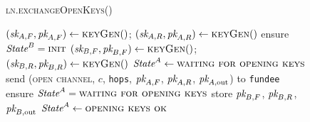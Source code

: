 \begin{figure}[H]
  \begin{processbox}{\textsc{ln.exchangeOpenKeys}()}
    \begin{algorithmic}[1]
      \State $(\textit{sk}_{A, F}, \textit{pk}_{A, F}) \gets \textsc{keyGen}()$;
      $(\textit{sk}_{A, R}, \textit{pk}_{A, R}) \gets \textsc{keyGen}()$
        \State ensure $\textit{State}^B = \textsc{init}$
        \State $(\textit{sk}_{B, F}, \textit{pk}_{B, F}) \gets \textsc{keyGen}()$; $(\textit{sk}_{B, R},
        \textit{pk}_{B, R}) \gets \textsc{keyGen}()$
      \Else \: 
        \State $\textit{State}^A \gets \textsc{waiting for opening keys}$
        \State send (\textsc{open channel}, $c$, \texttt{hops}, $\textit{pk}_{A, F}$,
        $\textit{pk}_{A, R}$, $\textit{pk}_{A, \mathrm{out}}$) to \texttt{fundee}
        \State {}
        \State {}
        \State {}
        \State {}
         
          \State {}
        \Else \: 
          \State {}
        \EndIf
        \State {}
        \State ensure $\textit{State}^A = \textsc{waiting for opening keys}$
        \State store $\textit{pk}_{B, F}$, $\textit{pk}_{B, R}$, $\textit{pk}_{B, \mathrm{out}}$
        \State $\textit{State}^A \gets \textsc{opening keys ok}$
      \EndIf
    \end{algorithmic}
  \end{processbox}
  \caption{}
  \label{code:ln:exchange-open-keys}
\end{figure}

